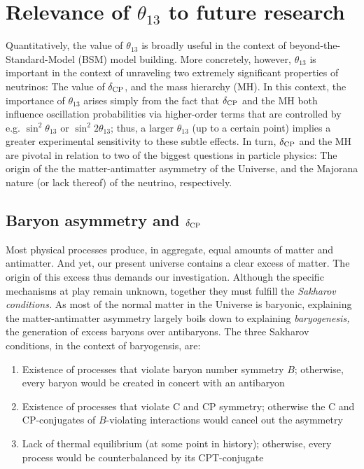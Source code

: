 \documentclass[../thesis.tex]{subfiles}
\begin{document}
\section{Relevance of $\theta_{13}$ to future research}
\label{sec:futureRelevance}

Quantitatively, the value of $\theta_{13}$ is broadly useful in the context of beyond-the-Standard-Model (BSM) model building. More concretely, however, $\theta_{13}$ is important in the context of unraveling two extremely significant properties of neutrinos: The value of $\delta_\text{CP}$, and the mass hierarchy (MH). In this context, the importance of $\theta_{13}$ arises simply from the fact that $\delta_\text{CP}$ and the MH both influence oscillation probabilities via higher-order terms that are controlled by e.g. \(\sin^2\theta_{13}\) or \(\sin^2 2\theta_{13}\); thus, a larger $\theta_{13}$ (up to a certain point) implies a greater experimental sensitivity to these subtle effects. In turn, $\delta_\text{CP}$ and the MH are pivotal in relation to two of the biggest questions in particle physics: The origin of the the matter-antimatter asymmetry of the Universe, and the Majorana nature (or lack thereof) of the neutrino, respectively.

\subsection{Baryon asymmetry and $\delta_\text{CP}$}
\label{sec:baryonAsym}

Most physical processes produce, in aggregate, equal amounts of matter and antimatter. And yet, our present universe contains a clear excess of matter. The origin of this excess thus demands our investigation. Although the specific mechanisms at play remain unknown, together they must fulfill the \emph{Sakharov conditions.} As most of the normal matter in the Universe is baryonic, explaining the matter-antimatter asymmetry largely boils down to explaining \emph{baryogenesis,} the generation of excess baryons over antibaryons. The three Sakharov conditions, in the context of baryogensis, are:

\begin{enumerate}
\item Existence of processes that violate baryon number symmetry $B$; otherwise, every baryon would be created in concert with an antibaryon
\item Existence of processes that violate C and CP symmetry; otherwise the C and CP-conjugates of $B$-violating interactions would cancel out the asymmetry
\item Lack of thermal equilibrium (at some point in history); otherwise, every process would be counterbalanced by its CPT-conjugate
\end{enumerate}
\end{document}
